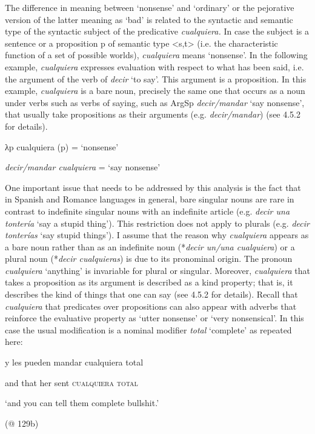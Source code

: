 The difference in meaning between ‘nonsense’ and ‘ordinary’ or the pejorative version of the latter meaning as ‘bad’ is related to the syntactic and semantic type of the syntactic subject of the predicative \textit{cualquiera.} In case the subject is a sentence or a proposition p of semantic type <s,t> (i.e. the characteristic function of a set of possible worlds), \textit{cualquiera} means ‘nonsense’. In the following example, \textit{cualquiera} expresses evaluation with respect to what has been said, i.e. the argument of the verb of \textit{decir} ‘to say’. This argument is a proposition. In this example, \textit{cualquiera} is a bare noun, precisely the same one that occurs as a noun under verbs such as verbs of saying, such as ArgSp \textit{decir/mandar} ‘say nonsense’, that usually take propositions as their arguments (e.g. \textit{decir/mandar}) (see 4.5.2 for details). 

    λp cualquiera (p) = ‘nonsense’

\textit{decir/mandar cualquiera} = ‘say nonsense’

One important issue that needs to be addressed by this analysis is the fact that in Spanish and Romance languages in general, bare singular nouns are rare in contrast to indefinite singular nouns with an indefinite article (e.g. \textit{decir una tontería} ‘say a stupid thing’). This restriction does not apply to plurals (e.g. \textit{decir tonterías} ‘say stupid things’). I assume that the reason why \textit{cualquiera} appears as a bare noun rather than as an indefinite noun (*\textit{decir un/una cualquiera}) or a plural noun (*\textit{decir cualquieras}) is due to its pronominal origin. The pronoun \textit{cualquiera} ‘anything’ is invariable for plural or singular. Moreover, \textit{cualquiera} that takes a proposition as its argument is described as a kind property; that is, it describes the kind of things that one can say (see 4.5.2 for details). Recall that \textit{cualquiera} that predicates over propositions can also appear with adverbs that reinforce the evaluative property as ‘utter nonsense’ or ‘very nonsensical’. In this case the usual modification is a nominal modifier \textit{total} ‘complete’ as repeated here:

    y  les  pueden  mandar  cualquiera total  

    and  that  her  sent  \textsc{cualquiera} \textsc{total}

    ‘and you can tell them complete bullshit.’

    (@ 129b)

